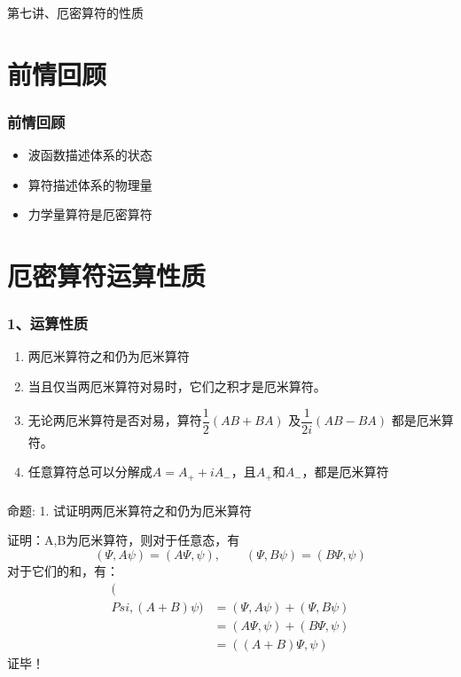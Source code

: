 \begin{frame}
    \frametitle{}
    \begin{center}
    { {\huge 第七讲、厄密算符的性质}}
    \end{center}    
\end{frame}


\section{前情回顾}

\begin{frame}
    \frametitle{前情回顾}
    \begin{itemize}
        \item 波函数描述体系的状态
        \item 算符描述体系的物理量
        \item 力学量算符是厄密算符
    \end{itemize}
\end{frame} 

\section{厄密算符运算性质}

\begin{frame}
    \frametitle{1、运算性质}
    \begin{enumerate}
        \item 两厄米算符之和仍为厄米算符
        \item 当且仅当两厄米算符对易时，它们之积才是厄米算符。
        \item 无论两厄米算符是否对易，算符$\dfrac{1}{2}(AB+BA)$ 及$\dfrac{1}{2i}(AB-BA) $  都是厄米算符。
        \item 任意算符总可以分解成$A=A_+ +iA_-$，且$A_+$和$A_-$，都是厄米算符
    \end{enumerate}
\end{frame} 

\begin{frame} [allowframebreaks=]
    \frametitle{}
    \begin{tcolorbox1}{命题:}
    1. 试证明两厄米算符之和仍为厄米算符 
    \end{tcolorbox1}
    \alert{证明：}A,B为厄米算符，则对于任意态，有\\
    $$(\Psi, A\psi ) = (A\Psi, \psi), \qquad (\Psi, B\psi ) = (B\Psi, \psi)$$
    对于它们的和，有： \\
    \begin{equation*}
        \begin{split}
            (\\Psi, (A+B)\psi ) &= (\Psi, A\psi ) + (\Psi, B\psi ) \\  
            &=(A\Psi, \psi ) + (B\Psi, \psi ) \\
            &=((A+B)\Psi, \psi ) 
         \end{split}
    \end{equation*}  
    证毕！
\end{frame} 

